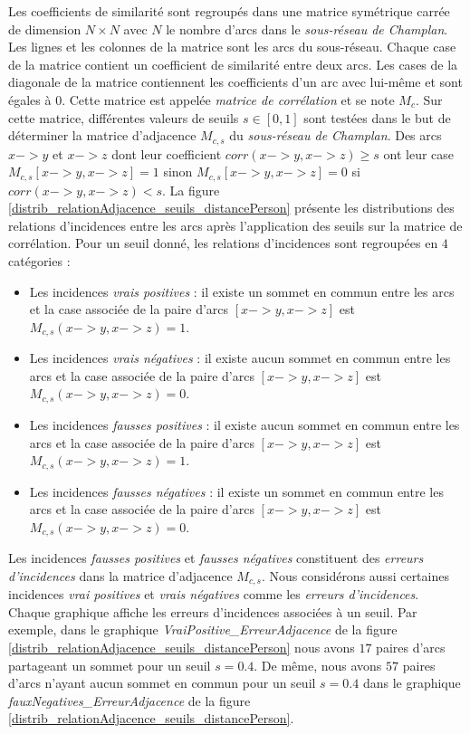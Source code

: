Les coefficients de similarit\'e sont regroup\'es dans une matrice sym\'etrique  carr\'ee de dimension $N \times N$ avec $N$ le nombre d'arcs dans le {\em sous-r\'eseau de Champlan}.
Les lignes et les colonnes de la matrice sont les arcs du sous-r\'eseau. Chaque case de la matrice contient un coefficient de similarit\'e entre deux arcs. Les cases de la diagonale de la matrice contiennent les coefficients d'un arc avec lui-m\^eme et sont \'egales \`a $0$.  
Cette matrice est appel\'ee {\em matrice de corr\'elation} et se note $M_c$.
Sur cette matrice, diff\'erentes valeurs de seuils $s \in [0,1]$ sont test\'ees dans le but de d\'eterminer la matrice d'adjacence $M_{c,s}$ du {\em sous-r\'eseau de Champlan}. 
Des arcs $x->y$ et $x->z$ dont leur coefficient $corr(x->y, x->z) \ge s$ ont leur case $M_{c,s}[x->y, x->z] = 1$ sinon $M_{c,s}[x->y, x->z] = 0$ si $corr(x->y, x->z) < s$. 
La figure \ref{distrib_relationAdjacence_seuils_distancePerson} pr\'esente les distributions des relations d'incidences entre les arcs apr\`es l'application  des seuils sur la matrice de corr\'elation. Pour un seuil donn\'e, les relations d'incidences sont regroup\'ees en $4$ cat\'egories :
\begin{itemize}
	\item Les incidences {\em vrais positives} : il existe un sommet en commun entre les arcs et la case associ\'ee de la paire d'arcs $[x->y, x->z]$ est $M_{c,s}(x->y, x->z) = 1$. 
	\item Les incidences {\em vrais n\'egatives} : il existe aucun sommet en commun entre les arcs et la case associ\'ee de la paire d'arcs $[x->y, x->z]$ est $M_{c,s}(x->y, x->z) = 0$. 
	\item Les incidences {\em fausses positives} :  il existe aucun sommet en commun entre les arcs et la case associ\'ee de la paire d'arcs $[x->y, x->z]$ est $M_{c,s}(x->y, x->z) = 1$. 
	\item Les incidences {\em fausses n\'egatives} :  il existe un sommet en commun entre les arcs et la case associ\'ee de la paire d'arcs $[x->y, x->z]$ est $M_{c,s}(x->y, x->z) = 0$. 
\end{itemize}
Les incidences {\em fausses positives} et {\em fausses n\'egatives} constituent des {\em erreurs d'incidences} dans la matrice d'adjacence $M_{c,s}$. Nous consid\'erons aussi certaines incidences {\em vrai positives}  et {\em vrais n\'egatives} comme les {\em erreurs d'incidences}.
Chaque graphique affiche les erreurs d'incidences associ\'ees \`a un seuil. Par exemple, dans le graphique {\em VraiPositive\_ErreurAdjacence} de la figure \ref{distrib_relationAdjacence_seuils_distancePerson} nous avons $17$ paires d'arcs partageant un sommet pour un seuil $s=0.4$. De m\^eme, nous avons $57$ paires d'arcs n'ayant aucun sommet en commun pour un seuil $s=0.4$ dans le graphique {\em fauxNegatives\_ErreurAdjacence} de la figure \ref{distrib_relationAdjacence_seuils_distancePerson}. 

